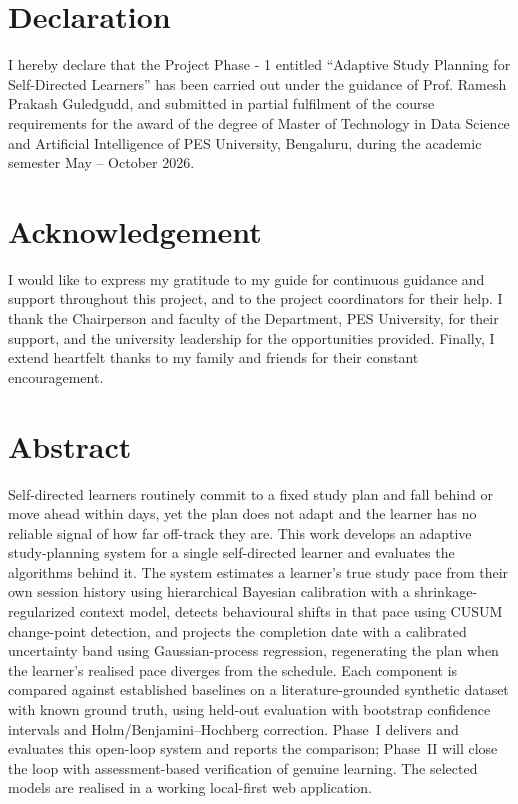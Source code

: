 \documentclass[12pt]{report}
\begin{document}
\newpage

\section*{Declaration}
I hereby declare that the Project Phase - 1 entitled ``Adaptive Study Planning for Self-Directed Learners'' has been carried out under the guidance of Prof. Ramesh Prakash Guledgudd, and submitted in partial fulfilment of the course requirements for the award of the degree of Master of Technology in Data Science and Artificial Intelligence of PES University, Bengaluru, during the academic semester May -- October 2026.

\newpage

\section*{Acknowledgement}
I would like to express my gratitude to my guide for continuous guidance and support throughout this project, and to the project coordinators for their help. I thank the Chairperson and faculty of the Department, PES University, for their support, and the university leadership for the opportunities provided. Finally, I extend heartfelt thanks to my family and friends for their constant encouragement.

\newpage

\section*{Abstract}
Self-directed learners routinely commit to a fixed study plan and fall behind or move ahead within days, yet the plan does not adapt and the learner has no reliable signal of how far off-track they are. This work develops an adaptive study-planning system for a single self-directed learner and evaluates the algorithms behind it. The system estimates a learner's true study pace from their own session history using hierarchical Bayesian calibration with a shrinkage-regularized context model, detects behavioural shifts in that pace using CUSUM change-point detection, and projects the completion date with a calibrated uncertainty band using Gaussian-process regression, regenerating the plan when the learner's realised pace diverges from the schedule. Each component is compared against established baselines on a literature-grounded synthetic dataset with known ground truth, using held-out evaluation with bootstrap confidence intervals and Holm/Benjamini--Hochberg correction. Phase~I delivers and evaluates this open-loop system and reports the comparison; Phase~II will close the loop with assessment-based verification of genuine learning. The selected models are realised in a working local-first web application.
\end{document}
